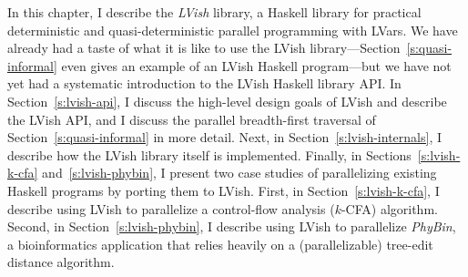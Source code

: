 In this chapter, I describe the \emph{LVish} library, a Haskell
library for practical deterministic and quasi-deterministic parallel
programming with LVars.  We have already had a taste of what it is
like to use the LVish library---Section~\ref{s:quasi-informal} even
gives an example of an LVish Haskell program---but we have not yet had
a systematic introduction to the LVish Haskell library API.  In
Section~\ref{s:lvish-api}, I discuss the high-level design goals of
LVish and describe the LVish API, and I discuss the parallel
breadth-first traversal of Section~\ref{s:quasi-informal} in more
detail.  Next, in Section~\ref{s:lvish-internals}, I describe how the
LVish library itself is implemented.  Finally, in
Sections~\ref{s:lvish-k-cfa} and~\ref{s:lvish-phybin}, I present two
case studies of parallelizing existing Haskell programs by porting
them to LVish.  First, in Section~\ref{s:lvish-k-cfa}, I describe
using LVish to parallelize a control-flow analysis ($k$-CFA)
algorithm.  Second, in Section~\ref{s:lvish-phybin}, I describe using
LVish to parallelize
\emph{PhyBin}, a bioinformatics application that relies heavily on a
(parallelizable) tree-edit distance algorithm.
